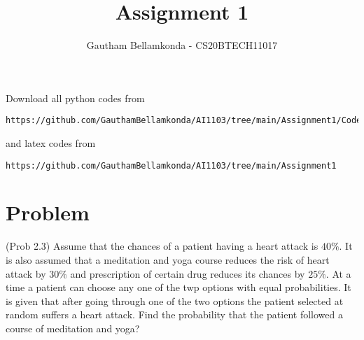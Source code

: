 \documentclass[journal,12pt,twocolumn]{IEEEtran}
\begin{document}
     \def\rightbox#1{\makebox[0in][r]{#1}}
     \def\centbox#1{\makebox[0in]{#1}}
     \def\topbox#1{\raisebox{-\baselineskip}[0in][0in]{#1}}
     \def\midbox#1{\raisebox{-0.5\baselineskip}[0in][0in]{#1}}
\vspace{3cm}
\title{Assignment 1}
\author{Gautham Bellamkonda - CS20BTECH11017}
\maketitle
\newpage
\bigskip
\renewcommand{\thefigure}{\theenumi}
\renewcommand{\thetable}{\theenumi}
Download all python codes from
\begin{lstlisting}
https://github.com/GauthamBellamkonda/AI1103/tree/main/Assignment1/Codes
\end{lstlisting}
and latex codes from 
\begin{lstlisting}
https://github.com/GauthamBellamkonda/AI1103/tree/main/Assignment1
\end{lstlisting}
\section*{Problem}
(Prob 2.3) Assume that the chances of a patient having a heart attack is $40 \% $. It is also assumed that a meditation and yoga course reduces the risk of heart attack by $30 \% $ and prescription of certain drug reduces its chances by $25 \% $. At a time a patient can choose any one of the twp options with equal probabilities. It is given that after going through one of the two options the patient selected at random suffers a heart attack. Find the probability that the patient followed a course of meditation and yoga? \\
\end{document}
